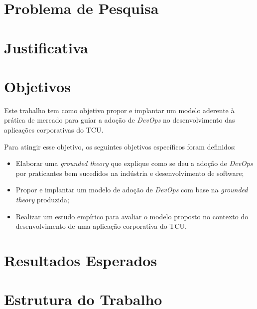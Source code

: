 \section{Problema de Pesquisa}%

\section{Justificativa}%


\section{Objetivos}
Este trabalho tem como objetivo propor e implantar um modelo aderente à prática
de mercado para guiar a adoção de \textit{DevOps} no desenvolvimento das
aplicações corporativas do \acrshort{TCU}.

Para atingir esse objetivo, os seguintes objetivos específicos foram definidos:

\begin{itemize}
\item Elaborar uma \textit{grounded theory} que explique como se deu a adoção
de \textit{DevOps} por praticantes bem sucedidos na indústria e desenvolvimento
de software;
\item Propor e implantar um modelo de adoção de \textit{DevOps} com base na
\textit{grounded theory} produzida;
\item Realizar um estudo empírico para avaliar o modelo proposto no contexto
do desenvolvimento de uma aplicação corporativa do \acrshort{TCU}.
\end{itemize}

\section{Resultados Esperados}

\section{Estrutura do Trabalho}

